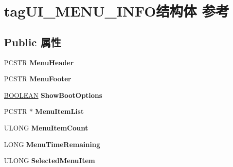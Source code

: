 \hypertarget{structtag_u_i___m_e_n_u___i_n_f_o}{}\section{tag\+U\+I\+\_\+\+M\+E\+N\+U\+\_\+\+I\+N\+F\+O结构体 参考}
\label{structtag_u_i___m_e_n_u___i_n_f_o}
\subsection*{Public 属性}
\begin{DoxyCompactItemize}
\item 
\mbox{\label{structtag_u_i___m_e_n_u___i_n_f_o_a07ce312db475aee04345d4fddd5194c5}} 
P\+C\+S\+TR {\bfseries Menu\+Header}
\item 
\mbox{\label{structtag_u_i___m_e_n_u___i_n_f_o_ab153dff730c253ba59b59a87c71d9b34}} 
P\+C\+S\+TR {\bfseries Menu\+Footer}
\item 
\mbox{\label{structtag_u_i___m_e_n_u___i_n_f_o_a13cb94755ecdd13eb366762228901cb8}} 
\hyperlink{_processor_bind_8h_a112e3146cb38b6ee95e64d85842e380a}{B\+O\+O\+L\+E\+AN} {\bfseries Show\+Boot\+Options}
\item 
\mbox{\label{structtag_u_i___m_e_n_u___i_n_f_o_ac946af74470641e2e9c1b1815cddfd88}} 
P\+C\+S\+TR $\ast$ {\bfseries Menu\+Item\+List}
\item 
\mbox{\label{structtag_u_i___m_e_n_u___i_n_f_o_abc81424d9495d49017cebf4ed7faafaf}} 
U\+L\+O\+NG {\bfseries Menu\+Item\+Count}
\item 
\mbox{\label{structtag_u_i___m_e_n_u___i_n_f_o_a63c422b5b138efb71215054b25139bca}} 
L\+O\+NG {\bfseries Menu\+Time\+Remaining}
\item 
\mbox{\label{structtag_u_i___m_e_n_u___i_n_f_o_a9ad2fafa9fe6ee81469a198d01812c64}} 
U\+L\+O\+NG {\bfseries Selected\+Menu\+Item}
\item 
\mbox{\label{structtag_u_i___m_e_n_u___i_n_f_o_aab3093e49b6f59666e9e84ca1ec8d61f}} 

\end{DoxyCompactItemize}

